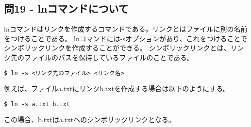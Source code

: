 \documentclass[a4paper,11pt]{jsarticle}
\begin{document}
\subsection*{問19 - lnコマンドについて}
lnコマンドはリンクを作成するコマンドである。リンクとはファイルに別の名前をつけることである。
lnコマンドには-sオプションがあり、これをつけることでシンボリックリンクを作成することができる。
シンボリックリンクとは、リンク先のファイルのパスを保持しているファイルのことである。
\begin{lstlisting}[caption=問19の解答]
$ ln -s <リンク先のファイル> <リンク名>
\end{lstlisting}
例えば、ファイルa.txtにリンクb.txtを作成する場合は以下のようにする。
\begin{lstlisting}[caption=問19の解答]
$ ln -s a.txt b.txt
\end{lstlisting}
この場合、b.txtはa.txtへのシンボリックリンクとなる。
\end{document}
